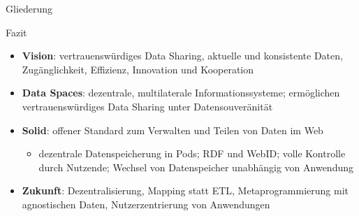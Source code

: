 




\maketitle



\begin{frame}{Gliederung}
    \tableofcontents
\end{frame}











\begin{frame}{Fazit}
    \begin{itemize}
        \item \textbf{Vision}: vertrauenswürdiges Data Sharing, aktuelle und konsistente Daten, Zugänglichkeit, Effizienz, Innovation und Kooperation
        \item \textbf{Data Spaces}: dezentrale, multilaterale Informationssysteme; ermöglichen vertrauenswürdiges Data Sharing unter Datensouveränität
        \item \textbf{Solid}: offener Standard zum Verwalten und Teilen von Daten im Web
        \begin{itemize}
            \item dezentrale Datenspeicherung in Pods; RDF und WebID; volle Kontrolle durch Nutzende; Wechsel von Datenspeicher unabhängig von Anwendung
        \end{itemize}
        \item \textbf{Zukunft}: Dezentralisierung, Mapping statt ETL, Metaprogrammierung mit agnostischen Daten, Nutzerzentrierung von Anwendungen
    \end{itemize}

\end{frame}


